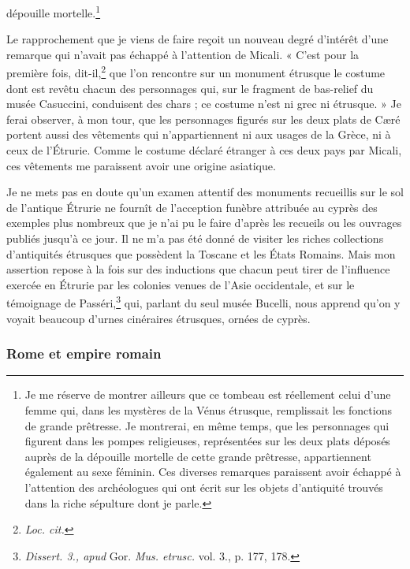\documentclass{article}
\begin{document}
dépouille mortelle.\footnote{Je me réserve de montrer ailleurs que ce tombeau est réellement celui d'une femme qui, dans les mystères de la Vénus étrusque, remplissait les fonctions de grande prêtresse. Je montrerai, en même temps, que les personnages qui figurent dans les pompes religieuses, représentées sur les deux plats déposés auprès de la dépouille mortelle de cette grande prêtresse, appartiennent également au sexe féminin. Ces diverses remarques paraissent avoir échappé à l'attention des archéologues qui ont écrit sur les objets d'antiquité trouvés dans la riche sépulture dont je parle.}

Le rapprochement que je viens de faire reçoit un nouveau degré d'intérêt d'une remarque qui n'avait pas échappé à l'attention de Micali. « C'est pour la première fois, dit-il,\footnote{\emph{Loc. cit.}} que l'on rencontre sur un monument étrusque le costume dont est revêtu chacun des personnages qui, sur le fragment de bas-relief du musée Casuccini, conduisent des chars ; ce costume n'est ni grec ni étrusque. » Je ferai observer, à mon tour, que les personnages figurés sur les deux plats de Cæré portent aussi des vêtements qui n'appartiennent ni aux usages de la Grèce, ni à ceux de l'Étrurie. Comme le costume déclaré étranger à ces deux pays par Micali, ces vêtements me paraissent avoir une origine asiatique.

Je ne mets pas en doute qu'un examen attentif des monuments recueillis sur le sol de l'antique Étrurie ne fournît de l'acception funèbre attribuée au cyprès des exemples plus nombreux que je n'ai pu le faire d'après les recueils ou les ouvrages publiés jusqu'à ce jour. Il ne m'a pas été donné de visiter les riches collections d'antiquités étrusques que possèdent la Toscane et les États Romains. Mais mon assertion repose à la fois sur des inductions que chacun peut tirer de l'influence exercée en Étrurie par les colonies venues de l'Asie occidentale, et sur le témoignage de Passéri,\footnote{\emph{Dissert. 3., apud} Gor. \emph{Mus. etrusc.} vol. 3., p. 177, 178.} qui, parlant du seul musée Bucelli, nous apprend qu'on y voyait beaucoup d'urnes cinéraires étrusques, ornées de cyprès.

\subsubsection{Rome et empire romain}
\end{document}
